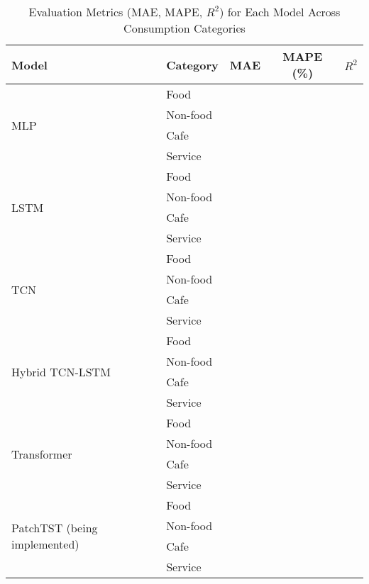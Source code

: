 \documentclass{article}
\begin{document}
\begin{table}[htbp]
\centering
\caption{Evaluation Metrics (MAE, MAPE, \( R^2 \)) for Each Model Across Consumption Categories}
\begin{tabular}{llccc}
\toprule
\textbf{Model} & \textbf{Category} & \textbf{MAE} & \textbf{MAPE (\%)} & \textbf{\( R^2 \)} \\
\midrule
\midrule

\multirow{4}{*}{MLP} 
  & Food       &  \\
  & Non-food   &  \\
  & Cafe       &  \\
  & Service    &  \\

\midrule
\multirow{4}{*}{LSTM} 
  & Food       &  \\
  & Non-food   &  \\
  & Cafe       &  \\
  & Service    &  \\


\midrule
\multirow{4}{*}{TCN} 
  & Food       &  \\
  & Non-food   &  \\
  & Cafe       &  \\
  & Service    &  \\

\midrule
\multirow{4}{*}{Hybrid TCN-LSTM} 
  & Food       &  \\
  & Non-food   &  \\
  & Cafe       &  \\
  & Service    &  \\

\midrule
\multirow{4}{*}{Transformer} 
  & Food       &  \\
  & Non-food   &  \\
  & Cafe       &  \\
  & Service    &  \\


\midrule
\multirow{4}{*}{PatchTST (being implemented)} 
  & Food       &  \\
  & Non-food   &  \\
  & Cafe       &  \\
  & Service    &  \\


\end{tabular}
\end{table}
\end{document}
